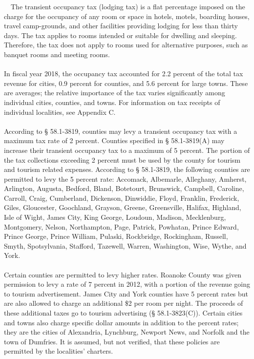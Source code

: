 \documentclass[
]{book}
\begin{document}
~~The transient occupancy tax (lodging tax) is a flat percentage imposed on the charge for the occupancy of any room or space in hotels, motels, boarding houses, travel camp-grounds, and other facilities providing lodging for less than thirty days. The tax applies to rooms intended or suitable for dwelling and sleeping. Therefore, the tax does not apply to rooms used for alternative purposes, such as banquet rooms and meeting rooms.\\
~\\
\hspace*{0.333em}\hspace*{0.333em}In fiscal year 2018, the occupancy tax accounted for 2.2 percent of the total tax revenue for cities, 0.9 percent for counties, and 5.6 percent for large towns. These are averages; the relative importance of the tax varies significantly among individual cities, counties, and towns. For information on tax receipts of individual localities, see Appendix C.\\
~\\
\hspace*{0.333em}\hspace*{0.333em}According to § 58.1-3819, counties may levy a transient occupancy tax with a maximum tax rate of 2 percent. Counties specified in § 58.1-3819(A) may increase their transient occupancy tax to a maximum of 5 percent. The portion of the tax collections exceeding 2 percent must be used by the county for tourism and tourism related expenses. According to § 58.1-3819, the following counties are permitted to levy the 5 percent rate: Accomack, Albemarle, Alleghany, Amherst, Arlington, Augusta, Bedford, Bland, Botetourt, Brunswick, Campbell, Caroline, Carroll, Craig, Cumberland, Dickenson, Dinwiddie, Floyd, Franklin, Frederick, Giles, Gloucester, Goochland, Grayson, Greene, Greensville, Halifax, Highland, Isle of Wight, James City, King George, Loudoun, Madison, Mecklenburg, Montgomery, Nelson, Northampton, Page, Patrick, Powhatan, Prince Edward, Prince George, Prince William, Pulaski, Rockbridge, Rockingham, Russell, Smyth, Spotsylvania, Stafford, Tazewell, Warren, Washington, Wise, Wythe, and York.\\
~\\
\hspace*{0.333em}\hspace*{0.333em}Certain counties are permitted to levy higher rates. Roanoke County was given permission to levy a rate of 7 percent in 2012, with a portion of the revenue going to tourism advertisement. James City and York counties have 5 percent rates but are also allowed to charge an additional \$2 per room per night. The proceeds of these additional taxes go to tourism advertising (§ 58.1-3823(C)). Certain cities and towns also charge specific dollar amounts in addition to the percent rates; they are the cities of Alexandria, Lynchburg, Newport News, and Norfolk and the town of Dumfries. It is assumed, but not verified, that these policies are permitted by the localities' charters.\\
\end{document}
